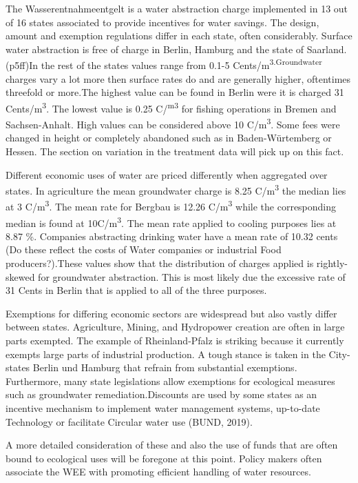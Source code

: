 \documentclass[11pt]{article}
\begin{document}
The Wasserentnahmeentgelt is a water abstraction charge implemented in 13 out of 16 states associated to provide incentives for water savings. The design, amount and exemption regulations differ in each state, often considerably. Surface water abstraction is free of charge in Berlin, Hamburg and the state of Saarland.(p5ff)In the rest of the states values range from 0.1-5 Cents/m\textsuperscript{3.Groundwater} charges vary a lot more then surface rates do and are generally higher, oftentimes threefold or more.The highest value can be found in Berlin were it is charged 31 Cents/m\textsuperscript{3}. The lowest value is 0.25 C/\textsuperscript{m}\textsuperscript{3} for fishing operations in Bremen and Sachsen-Anhalt. High values can be considered above 10 C/m\textsuperscript{3}. Some fees were changed in height or completely abandoned such as in Baden-Würtemberg or Hessen. The section on variation in the treatment data will pick up on this fact.

Different economic uses of water are priced differently when aggregated over states. In agriculture the mean groundwater charge is 8.25 C/m\textsuperscript{3} the median lies at 3 C/m\textsuperscript{3}. The mean rate for Bergbau is 12.26 C/m\textsuperscript{3} while the corresponding median is found at 10C/m\textsuperscript{3}. The mean rate applied to cooling purposes lies at 8.87 \%. Companies abstracting drinking water have a mean rate of 10.32 cents (Do these reflect the costs of Water companies or industrial Food producers?).These values show that the distribution of charges applied is rightly-skewed for groundwater abstraction. This is most likely due the excessive rate of 31 Cents in Berlin that is applied to all of the three purposes.

Exemptions for differing economic sectors are widespread but also vastly differ between states. Agriculture, Mining, and Hydropower creation are often in large parts exempted. The example of Rheinland-Pfalz is striking because it currently exempts large parts of industrial production. A tough stance is taken in the City-states Berlin und Hamburg that refrain from substantial exemptions. Furthermore, many state legislations allow exemptions for ecological measures such as groundwater remediation.Discounts are used by some states as an incentive mechanism to implement water management systems, up-to-date Technology or facilitate Circular water use ({BUND}, 2019).

A more detailed consideration of these and also the use of funds that are often bound to ecological uses will be foregone at this point. Policy makers often associate the WEE with promoting efficient handling of water resources.
\end{document}
